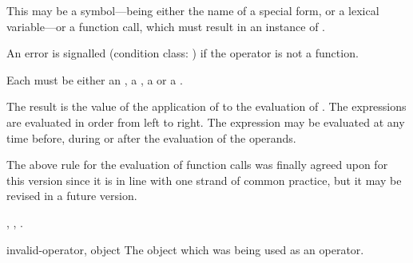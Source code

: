 \begin{optDefinition}
%
\Syntax
{}%
%
\begin{arguments}
    \item[\scref{operator}] This may be a symbol---being either the name of a
    special form, or a lexical variable---or a function call, which must result
    in an instance of .

    An error is signalled (condition class: 
    ) if the operator is not a function.

    \item[\scseqref{operand}] Each  must be either an
    , a , a  or a
    .
\end{arguments}
%
\result%
The result is the value of the application of  to the
evaluation of .
%
\remarks%
The  expressions are evaluated in order from left to
right.  The  expression may be evaluated at any time
before, during or after the evaluation of the operands.
%
\begin{note}
    The above rule for the evaluation of function calls was finally agreed upon
    for this version since it is in line with one strand of common practice, but
    it may be revised in a future version.
\end{note}
%
\seealso%
, , .

%
\begin{initoptions}
    \item[invalid-operator, object] The object which was being used as an
    operator.


\end{initoptions}
\end{optDefinition}
